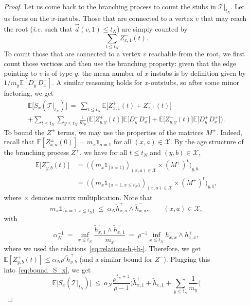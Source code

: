 \begin{refsegment}
\begin{proof}
Let us come back to the branching process to count the stubs in
$\mathcal{T}|_{t_N}$. Let us focus on the $x$-instubs. Those that are
connected to a vertex $v$ that may reach the root (\textit{i.e.}
such that $\vec{d}(v,1)\leq t_N$) are simply counted by
\[
  \sum_{t\leq t_N}Z^-_{x,1}(t).
\]
To count those that are connected to a vertex $v$ reachable from the
root, we first count those vertices and then use the branching
property: given that the edge pointing to $v$ is of type $y$, the mean
number of $x$-instubs is by definition given by
$1/m_y \mathbb{E}[D_y^-D_x^-]$. A similar reasoning holds for
$x$-outstubs, so after some minor factoring, we get
\begin{multline}
  \label{eq:bound_S_x}
    \mathbb{E}\big[S_x(\mathcal{T}|_{t_N})\big]\
     =\ \sum_{t\leq t_N}\mathbb{E}\big[Z^+_{x,1}(t) + Z^-_{x,1}(t)\big] \\
     + \sum_{t\leq t_N} \sum_{y\leq t_N} \frac{1}{m_y}\Big(
      \mathbb{E}\big[Z^+_{y,y}(t)\big]\mathbb{E}\big[D_y^-D_x^-] + \mathbb{E}\big[Z^-_{y,y}(t)\big]\mathbb{E}\big[D_y^+D_x^+] \Big).
  \end{multline}
To bound the $Z^\pm$ terms, we may use the properties of the
matrices $M^\pm$. Indeed, recall that
$\mathbb{E}[Z^\pm_{x,a}(0)]=m_x\mathds{1}_{a=1}$ for all
$(x,a)\in \mathcal{X}$. By the age structure of the branching
process $Z^+$, we have for all $t\leq t_N$ and $(y,b)\in \mathcal{X}$,
\begin{align*}
  \mathbb{E} \big[Z^+_{y,b}(t)\big]\ &=\ \Big((m_x\mathds{1}_{\{a=1\}})_{(x,a)\in
    \mathcal{X}} \times (M^+)^t\Big)_{y,b}\\
    &=\ \Big((m_x\mathds{1}_{\{a=1,x\leq
  t_N\}})_{(x,a)\in
    \mathcal{X}} \times (M^+)^t\Big)_{y,b},
\end{align*}
where $\times$ denotes matrix multiplication.
Note that
\[
  m_x\mathds{1}_{\{a=1,x\leq t_N\}}\ \leq\ \alpha_N
  \tilde{h}^+_{x,a}\wedge \tilde{h}^-_{x,a}, \qquad (x,a)\in \mathcal{X},
\]
with
\[
  \alpha_N^{-1}\ =\ \inf_{x\leq t_N} \frac{\tilde{h}^+_{x,1}\wedge\tilde{h}^-_{x,1}}{m_x}\ =\
  \rho^{-1} \inf_{x\leq t_N} h^-_{x,x} \wedge h^+_{x,x},
\]
where we used the relations~\eqref{eq:relations-h+h-}. Therefore, we get
$\mathbb{E} [Z^+_{y,b}(t)] \leq \alpha_N \rho^t \tilde{h}^+_{y,b}$
(and a similar bound for $Z^-$). Plugging this
into~\eqref{eq:bound_S_x}, we get
\[
  \mathbb{E}\big[S_x(\mathcal{T}|_{t_N})\big]\ \leq\ \alpha_N
  \frac{\rho^{t_N+1}}{\rho-1} \Big(\tilde{h}^+_{x,1} +
  \tilde{h}^-_{x,1} + \sum_{y\leq t_N} \frac{1}{m_y}\Big(
\]
\end{proof}
\end{refsegment}
